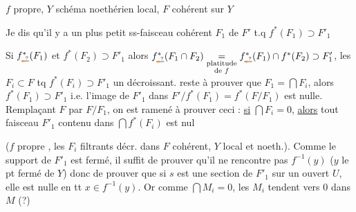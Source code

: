 $f$  propre, $Y$ schéma noethérien local, $F$ cohérent sur $Y$


 Je dis qu'il y a un plus petit ss-faisceau cohérent $F_1$ de $F'$ t.q $f^*(F_1)\supset F'_1$


Si $f_{\deleted{\unsure{*}}}^*(F_1)$ et $f^*(F_2)\supset F'_1$ alors $f_{\deleted{\unsure{*}}}^*(F_1\cap F_2)\underset{\substack{\text{platitude}\\\text{de }f}}{=}f_{\deleted{\unsure{*}}}^*(F_1)\cap f^*(F_2)\supset F'_1$, les $F_i\subset F$ tq $f^*(F_i)\supset F'_1$  un  décroissant.  reste à prouver que $F_1=\bigcap F_i$, alors $f^*(F_1)\supset F'_1$ i.e. l'image de $F'_1$ dans $F'/f^*(F_1)=f^*(F/F_1)$ est nulle. Remplaçant $F$ par $F/F_1$, on est ramené à prouver ceci : \uline{si} $\bigcap F_i=0$, \uline{alors} tout faisceau  $F'_1$ contenu dans $\bigcap f^*(F_i)$ est nul



 ($f$ propre , les $F_i$ filtrants décr. dans $F$ cohérent, $Y$ local et noeth.).  Comme le support de  $F'_1$ est fermé, il suffit de prouver qu'il ne rencontre pas $f^{-1}(y)$ ($y$ le pt fermé de $Y$) donc de prouver que si $s$ est une section de $F'_1$ sur un ouvert $U$, elle est nulle en tt $x\in f^{-1}(y)$. Or comme  $\bigcap M_i=0$, les $M_i$ tendent vers $0$ dans $M$ (?)


